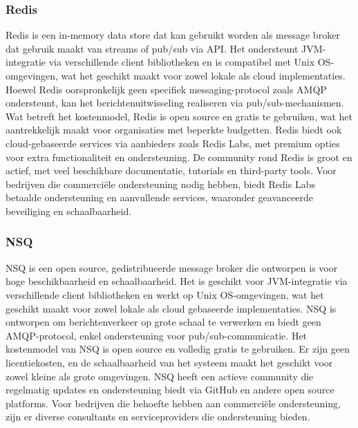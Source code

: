 \subsubsection{Redis}
Redis is een in-memory data store dat kan gebruikt worden als message broker dat gebruik maakt van streams of pub/sub via API. 
Het ondersteunt JVM-integratie via verschillende client bibliotheken en is compatibel met Unix OS-omgevingen, 
wat het geschikt maakt voor zowel lokale als cloud implementaties.
Hoewel Redis oorspronkelijk geen specifiek messaging-protocol zoals AMQP ondersteunt, 
kan het berichtenuitwisseling realiseren via pub/sub-mechanismen. 
Wat betreft het kostenmodel, Redis is open source en gratis te gebruiken, wat het aantrekkelijk maakt voor organisaties met beperkte budgetten. 
Redis biedt ook cloud-gebaseerde services via aanbieders zoals Redis Labs, met premium opties voor extra functionaliteit en ondersteuning.
De community rond Redis is groot en actief, met veel beschikbare documentatie, tutorials en third-party tools. 
Voor bedrijven die commerciële ondersteuning nodig hebben, biedt Redis Labs betaalde ondersteuning en aanvullende services, waaronder geavanceerde beveiliging en schaalbaarheid.

\subsubsection{NSQ}
NSQ is een open source, gedistribueerde message broker die ontworpen is voor hoge beschikbaarheid en schaalbaarheid. 
Het is geschikt voor JVM-integratie via verschillende client bibliotheken en werkt op Unix OS-omgevingen, 
wat het geschikt maakt voor zowel lokale als cloud gebaseerde implementaties.
NSQ is ontworpen om berichtenverkeer op grote schaal te verwerken en biedt geen AMQP-protocol, enkel ondersteuning voor pub/sub-communicatie. 
Het kostenmodel van NSQ is open source en volledig gratis te gebruiken. 
Er zijn geen licentiekosten, en de schaalbaarheid van het systeem maakt het geschikt voor zowel kleine als grote omgevingen.
NSQ heeft een actieve community die regelmatig updates en ondersteuning biedt via GitHub en andere open source platforms. 
Voor bedrijven die behoefte hebben aan commerciële ondersteuning, zijn er diverse consultants en serviceproviders die ondersteuning bieden.

